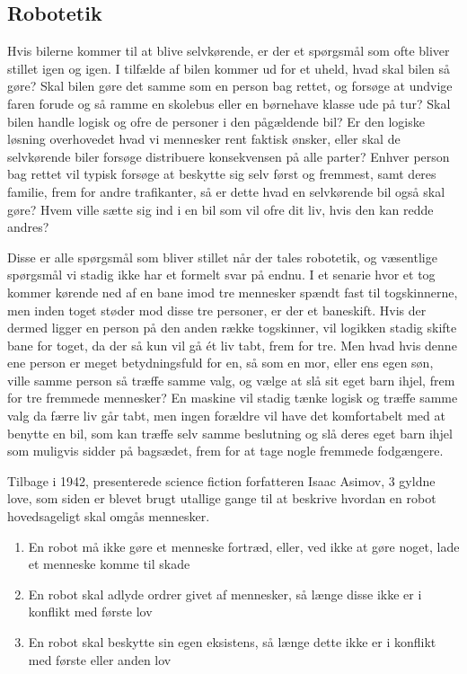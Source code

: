 \subsection{Robotetik}
	Hvis bilerne kommer til at blive selvkørende, er der et spørgsmål som ofte bliver stillet igen og igen. I tilfælde af bilen kommer ud for et uheld, hvad skal bilen så gøre? Skal bilen gøre det samme som en person bag rettet, og forsøge at undvige faren forude og så ramme en skolebus eller en børnehave klasse ude på tur? Skal bilen handle logisk og ofre de personer i den pågældende bil? Er den logiske løsning overhovedet hvad vi mennesker rent faktisk ønsker, eller skal de selvkørende biler forsøge distribuere konsekvensen på alle parter? Enhver person bag rettet vil typisk forsøge at beskytte sig selv først og fremmest, samt deres familie, frem for andre trafikanter, så er dette hvad en selvkørende bil også skal gøre? Hvem ville sætte sig ind i en bil som vil ofre dit liv, hvis den kan redde andres?
	
	Disse er alle spørgsmål som bliver stillet når der tales robotetik, og væsentlige spørgsmål vi stadig ikke har et formelt svar på endnu. I et senarie hvor et tog kommer kørende ned af en bane imod tre mennesker spændt fast til togskinnerne, men inden toget støder mod disse tre personer, er der et baneskift. Hvis der dermed ligger en person på den anden række togskinner, vil logikken stadig skifte bane for toget, da der så kun vil gå ét liv tabt, frem for tre. Men hvad hvis denne ene person er meget betydningsfuld for en, så som en mor, eller ens egen søn, ville samme person så træffe samme valg, og vælge at slå sit eget barn ihjel, frem for tre fremmede mennesker? En maskine vil stadig tænke logisk og træffe samme valg da færre liv går tabt, men ingen forældre vil have det komfortabelt med at benytte en bil, som kan træffe selv samme beslutning og slå deres eget barn ihjel som muligvis sidder på bagsædet, frem for at tage nogle fremmede fodgængere.
	
	Tilbage i 1942, presenterede science fiction forfatteren Isaac Asimov, 3 gyldne love, som siden er blevet brugt utallige gange til at beskrive hvordan en robot hovedsageligt skal omgås mennesker.
	
	\begin{enumerate}
		
		\item En robot må ikke gøre et menneske fortræd, eller, ved ikke at gøre noget, lade et menneske komme til skade
		\item En robot skal adlyde ordrer givet af mennesker, så længe disse ikke er i konflikt med første lov
		\item En robot skal beskytte sin egen eksistens, så længe dette ikke er i konflikt med første eller anden lov
		
	\end{enumerate}
	
